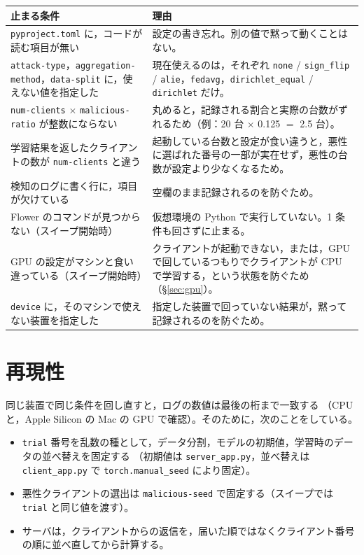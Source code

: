 \documentclass[a4j, dvipdfmx]{jsarticle}  %
\begin{document}
\begin{table}[H]
\centering
\begin{tabular}{@{}P{6.4cm} P{8.9cm}@{}}
\toprule
止まる条件 & 理由 \\
\midrule
\texttt{pyproject.toml} に，コードが読む項目が無い & 設定の書き忘れ。別の値で黙って動くことはない。 \\
\texttt{attack-type}，\texttt{aggregation-method}，\texttt{data-split} に，使えない値を指定した &
現在使えるのは，それぞれ \texttt{none} / \texttt{sign\_flip} / \texttt{alie}，\texttt{fedavg}，\texttt{dirichlet\_equal} / \texttt{dirichlet} だけ。 \\
\texttt{num-clients} $\times$ \texttt{malicious-ratio} が整数にならない &
丸めると，記録される割合と実際の台数がずれるため（例：20 台 $\times$ 0.125 $=$ 2.5 台）。 \\
学習結果を返したクライアントの数が \texttt{num-clients} と違う &
起動している台数と設定が食い違うと，悪性に選ばれた番号の一部が実在せず，悪性の台数が設定より少なくなるため。 \\
検知のログに書く行に，項目が欠けている & 空欄のまま記録されるのを防ぐため。 \\
Flower のコマンドが見つからない（スイープ開始時） & 仮想環境の Python で実行していない。1 条件も回さずに止まる。 \\
GPU の設定がマシンと食い違っている（スイープ開始時） & クライアントが起動できない，または，GPU で回しているつもりでクライアントが CPU で学習する，という状態を防ぐため（\S\ref{sec:gpu}）。 \\
\texttt{device} に，そのマシンで使えない装置を指定した & 指定した装置で回っていない結果が，黙って記録されるのを防ぐため。 \\
\bottomrule
\end{tabular}
\end{table}

\section{再現性}

同じ装置で同じ条件を回し直すと，ログの数値は最後の桁まで一致する
（CPU と，Apple Silicon の Mac の GPU で確認）。そのために，次のことをしている。

\begin{itemize}
  \item \texttt{trial} 番号を乱数の種として，データ分割，モデルの初期値，学習時のデータの並べ替えを固定する
        （初期値は \texttt{server\_app.py}，並べ替えは \texttt{client\_app.py} で \texttt{torch.manual\_seed} により固定）。
  \item 悪性クライアントの選出は \texttt{malicious-seed} で固定する（スイープでは \texttt{trial} と同じ値を渡す）。
  \item サーバは，クライアントからの返信を，届いた順ではなくクライアント番号の順に並べ直してから計算する。
\end{itemize}
\end{document}
